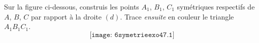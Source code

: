 Sur la figure ci-dessous, construis les points $A_1$, $B_1$, $C_1$
symétriques respectifs de $A$, $B$, $C$ par rapport à la droite $(d)$.
Trace {\em ensuite} en couleur le triangle $A_1B_1C_1$.
\[\texttt{[image: 6symetrieexo47.1]}\]